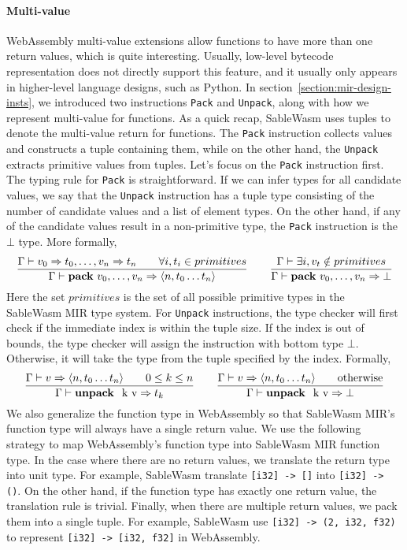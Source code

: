 \paragraph{Multi-value}
WebAssembly multi-value extensions allow functions to have more than one return
values, which is quite interesting. Usually, low-level bytecode representation
does not directly support this feature, and it usually only appears in
higher-level language designs, such as Python. In
section~\ref{section:mir-design-insts}, we introduced
two instructions \texttt{Pack} and \texttt{Unpack}, along with how we represent
multi-value for functions. As a quick recap, SableWasm uses tuples to denote the
multi-value return for functions. The \texttt{Pack} instruction collects values
and constructs a tuple containing them, while on the other hand, the
\texttt{Unpack} extracts primitive values from tuples. Let's focus on the
\texttt{Pack} instruction first. The typing rule for \texttt{Pack} is
straightforward. If we can infer types for all candidate values, we say that the
\texttt{Unpack} instruction has a tuple type consisting of the number of
candidate values and a list of element types. On the other hand, if any of the
candidate values result in a non-primitive type, the \texttt{Pack} instruction
is the $\bot$ type. More formally,
$$
    \frac
    {\Gamma \vdash v_0 \Rightarrow t_0, \dots, v_n \Rightarrow t_n \qquad \forall i, t_i \in primitives}
    {\Gamma \vdash \text{\textbf{pack} } v_0, \dots, v_n \Rightarrow \langle n, t_0 \dots t_n \rangle}
    \qquad
    \frac
    {\Gamma \vdash \exists i, v_t \notin primitives}
    {\Gamma \vdash \text{\textbf{pack} } v_0, \dots, v_n \Rightarrow \bot}
$$
Here the set $primitives$ is the set of all possible primitive types in the
SableWasm MIR type system. For \texttt{Unpack} instructions, the type checker
will first check if the immediate index is within the tuple size. If the index
is out of bounds, the type checker will assign the instruction with bottom type
$\bot$. Otherwise, it will take the type from the tuple specified by the index.
Formally,
$$
    \frac
    {\Gamma \vdash v \Rightarrow \langle n, t_0 \dots t_n \rangle \qquad 0 \leq k \leq n}
    {\Gamma \vdash \text{\textbf{unpack } k v} \Rightarrow t_k}
    \qquad
    \frac
    {\Gamma \vdash v \Rightarrow \langle n, t_0 \dots t_n \rangle \qquad \text{otherwise}}
    {\Gamma \vdash \text{\textbf{unpack } k v} \Rightarrow \bot}
$$
We also generalize the function type in WebAssembly so that SableWasm MIR's
function type will always have a single return value. We use the following
strategy to map WebAssembly's function type into SableWasm MIR function type.
In the case where there are no return values, we translate the return type into
unit type. For example, SableWasm translate \texttt{[i32] -> []} into
\texttt{[i32] -> ()}. On the other hand, if the function type has exactly one
return value, the translation rule is trivial. Finally, when there are multiple
return values, we pack them into a single tuple. For example, SableWasm use
\texttt{[i32] -> (2, i32, f32)} to represent \texttt{[i32] -> [i32, f32]} in
WebAssembly.

